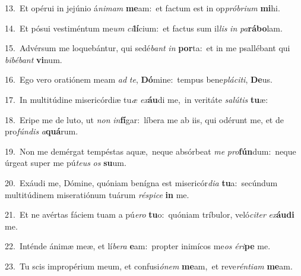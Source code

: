 {\numbfont\textcolor{\numbcolor}{13.}}~Et opérui in jejúnio á\-\textit{ni}\-\textit{mam} \textbf{me}\-am:~\star et factum est in op\-\textit{pró}\-\textit{bri}\textit{um} \textbf{mi}\-hi.\par
{\numbfont\textcolor{\numbcolor}{14.}}~Et pósui vestiméntum me\textit{um} \textit{ci}\-\textbf{lí}cium:~\star et factus sum il\textit{lis} \textit{in} \textit{pa}\-\textbf{rá}\textbf{bo}lam.\par
{\numbfont\textcolor{\numbcolor}{15.}}~Advérsum me loquebántur, qui sedé\textit{bant} \textit{in} \textbf{por}\-ta:~\star et in me psallébant qui \textit{bi}\-\textit{bé}\textit{bant} \textbf{vi}\-num.\par
{\numbfont\textcolor{\numbcolor}{16.}}~Ego vero oratiónem meam \textit{ad} \textit{te}\-, \textbf{Dó}\-mine:~\star tempus bene\-\textit{plá}\-\textit{ci}\textit{ti}, \textbf{De}\-us.\par
{\numbfont\textcolor{\numbcolor}{17.}}~In multitúdine misericórdiæ tu\textit{æ} \textit{ex}\-\textbf{áu}di me,~\star in veritáte \textit{sa}\-\textit{lú}\textit{tis} \textbf{tu}\-æ:\par
{\numbfont\textcolor{\numbcolor}{18.}}~Eripe me de luto, ut \textit{non} \textit{in}\-\textbf{fí}gar:~\star líbera me ab iis, qui odérunt me, et de pro\-\textit{fún}\-\textit{dis} \textit{a}\-\textbf{quá}rum.\par
{\numbfont\textcolor{\numbcolor}{19.}}~Non me demérgat tempéstas aquæ,~\dagger neque absórbeat \textit{me} \textit{pro}\-\textbf{fún}dum:~\star neque úrgeat super me pú\-\textit{te}\-\textit{us} \textit{os} \textbf{su}\-um.\par
{\numbfont\textcolor{\numbcolor}{20.}}~Exáudi me, Dómine, quóniam benígna est misericór\-\textit{di}\-\textit{a} \textbf{tu}\-a:~\star secúndum multitúdinem miseratiónum tuárum \textit{ré}\-\textit{spi}\textit{ce} \textbf{in} me.\par
{\numbfont\textcolor{\numbcolor}{21.}}~Et ne avértas fáciem tuam a pú\-\textit{e}\-\textit{ro} \textbf{tu}\-o:~\star quóniam tríbulor, veló\-\textit{ci}\-\textit{ter} \textit{ex}\-\textbf{áu}\textbf{di} me.\par
{\numbfont\textcolor{\numbcolor}{22.}}~Inténde ánimæ meæ, et lí\-\textit{be}\-\textit{ra} \textbf{e}\-am:~\star propter inimícos me\textit{os} \textit{é}\-\textit{ri}\textbf{pe} me.\par
{\numbfont\textcolor{\numbcolor}{23.}}~Tu scis impropérium meum, et confusi\-\textit{ó}\-\textit{nem} \textbf{me}\-am,~\star et reve\-\textit{rén}\-\textit{ti}\textit{am} \textbf{me}\-am.\par
